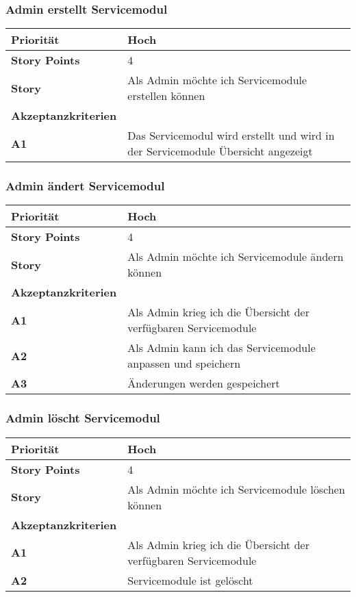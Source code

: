  \subsubsection{Admin erstellt Servicemodul}
\begin{tabularx}{\linewidth}{l X}
  \textbf{Priorität} & Hoch\\
  \hline
  \textbf{Story Points} & 4\\
  \hline
  \textbf{Story}& Als Admin möchte ich Servicemodule erstellen können\\
 \hline
    \textbf{Akzeptanzkriterien} & \\
    \hline
  \textbf{A1} & Das Servicemodul wird erstellt und wird in der Servicemodule Übersicht angezeigt\\
  \hline
\end{tabularx}
 
   \subsubsection{Admin ändert Servicemodul}
\begin{tabularx}{\linewidth}{l X}
  \textbf{Priorität} & Hoch\\
  \hline
  \textbf{Story Points} & 4\\
  \hline
  \textbf{Story}& Als Admin möchte ich Servicemodule ändern können\\
  \hline
   \textbf{Akzeptanzkriterien} & \\
    \hline
  \textbf{A1} & Als Admin krieg ich die Übersicht der verfügbaren Servicemodule\\
  \hline
  \textbf{A2} & Als Admin kann ich das Servicemodule anpassen und speichern\\
  \hline
   \textbf{A3} & Änderungen werden gespeichert\\
 \hline
 \end{tabularx}

 
 \subsubsection{Admin löscht Servicemodul}

 \begin{tabularx}{\linewidth}{l X}
 \textbf{Priorität} & Hoch\\
 \hline
  \textbf{Story Points} & 4\\
  \hline
  \textbf{Story}& Als Admin möchte ich Servicemodule löschen können\\
  \hline
   \textbf{Akzeptanzkriterien} & \\
   \hline
   \textbf{A1} & Als Admin krieg ich die Übersicht der verfügbaren Servicemodule\\
   \hline
   \textbf{A2} & Servicemodule ist gelöscht\\
     \hline
\end{tabularx}

